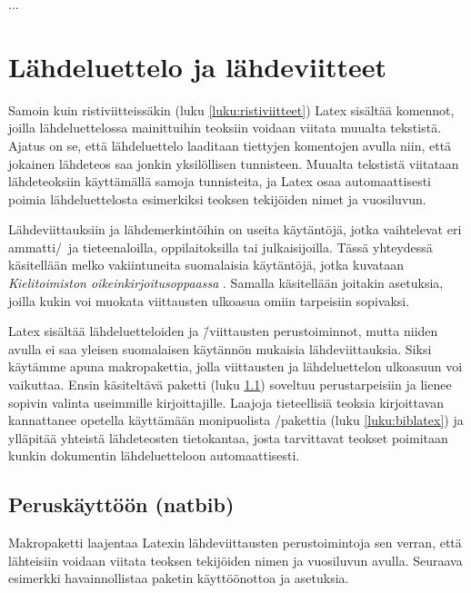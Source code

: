 
...

\section{Lähdeluettelo ja lähdeviitteet}
\label{luku:lähteet}

Samoin kuin ristiviitteissäkin (luku \ref{luku:ristiviitteet}) Latex
sisältää komennot, joilla lähdeluettelossa mainittuihin teoksiin voidaan
viitata muualta tekstistä. Ajatus on se, että lähdeluettelo laaditaan
tiettyjen komentojen avulla niin, että jokainen lähdeteos saa jonkin
yksilöllisen tunnisteen. Muualta tekstistä viitataan lähdeteoksiin
käyttämällä samoja tunnisteita, ja Latex osaa automaattisesti poimia
lähdeluettelosta esimerkiksi teoksen tekijöiden nimet ja vuosiluvun.

Lähdeviittauksiin ja lähdemerkintöihin on useita käytäntöjä, jotka
vaihtelevat eri ammatti\-/\ ja tieteenaloilla, oppilaitoksilla tai
julkaisijoilla. Tässä yhteydessä käsitellään melko vakiintuneita
suomalaisia käytäntöjä, jotka kuvataan \emph{Kielitoimiston
  oikeinkirjoitusoppaassa} \parencite{kt_oik}. Samalla käsitellään
joitakin asetuksia, joilla kukin voi muokata viittausten ulkoasua omiin
tarpeisiin sopivaksi.

Latex sisältää lähdeluetteloiden ja \=/viittausten perustoiminnot, mutta
niiden avulla ei saa yleisen suomalaisen käytännön mukaisia
lähdeviittauksia. Siksi käytämme apuna makropakettia, jolla viittausten
ja lähdeluettelon ulkoasuun voi vaikuttaa. Ensin käsiteltävä paketti
 (luku \ref{luku:natbib}) soveltuu perustarpeisiin ja
lienee sopivin valinta useimmille kirjoittajille. Laajoja tieteellisiä
teoksia kirjoittavan kannattanee opetella käyttämään monipuolista
\-/pakettia (luku \ref{luku:biblatex}) ja ylläpitää
yhteistä lähdeteosten tietokantaa, josta tarvittavat teokset poimitaan
kunkin dokumentin lähdeluetteloon automaattisesti.

\subsection{Peruskäyttöön (natbib)}
\label{luku:natbib}

Makropaketti  laajentaa Latexin
lähdeviittausten perustoimintoja sen verran, että lähteisiin voidaan
viitata teoksen tekijöiden nimen ja vuosiluvun avulla. Seuraava
esimerkki havainnollistaa paketin käyttöönottoa ja asetuksia.


